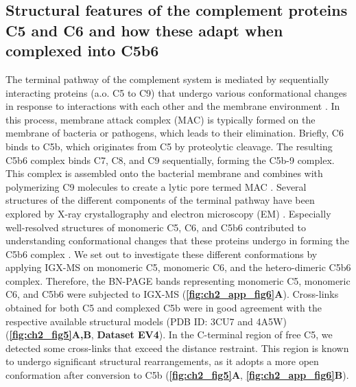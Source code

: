 \subsection*{Structural features of the complement proteins C5 and C6 and how these adapt when complexed into C5b6}
The terminal pathway of the complement system is mediated by sequentially interacting proteins (a.o. C5 to C9) that undergo various conformational changes in response to interactions with each other and the membrane environment \cite{Bajic_2015, Bayly-Jones_2017, Hadders_2012, Schatz-Jakobsen_2016}. In this process, membrane attack complex (MAC) is typically formed on the membrane of bacteria or pathogens, which leads to their elimination. Briefly, C6 binds to C5b, which originates from C5 by proteolytic cleavage. The resulting C5b6 complex binds C7, C8, and C9 sequentially, forming the C5b-9 complex. This complex is assembled onto the bacterial membrane and combines with polymerizing C9 molecules to create a lytic pore termed MAC \cite{Esser_1994}. Several structures of the different components of the terminal pathway have been explored by X-ray crystallography and electron microscopy (EM) \cite{Aleshin_2012, DiScipio_1988, DiScipio_1989, Fredslund_2008, Hadders_2012, Lovelace_2011, Menny_2018}. Especially well-resolved structures of monomeric C5, C6, and C5b6 contributed to understanding conformational changes that these proteins undergo in forming the C5b6 complex \cite{Aleshin_2012, Fredslund_2008, Hadders_2012}. We set out to investigate these different conformations by applying IGX-MS on monomeric C5, monomeric C6, and the hetero-dimeric C5b6 complex. Therefore, the BN-PAGE bands representing monomeric C5, monomeric C6, and C5b6 were subjected to IGX-MS (\textbf{\autoref{fig:ch2_app_fig6}A}). Cross-links obtained for both C5 and complexed C5b were in good agreement with the respective available structural models (PDB ID: 3CU7 and 4A5W) (\textbf{\autoref{fig:ch2_fig5}A,B}, \textbf{Dataset EV4}). In the C-terminal region of free C5, we detected some cross-links that exceed the distance restraint. This region is known to undergo significant structural rearrangements, as it adopts a more open conformation after conversion to C5b (\textbf{\autoref{fig:ch2_fig5}A}, \textbf{\autoref{fig:ch2_app_fig6}B}).
